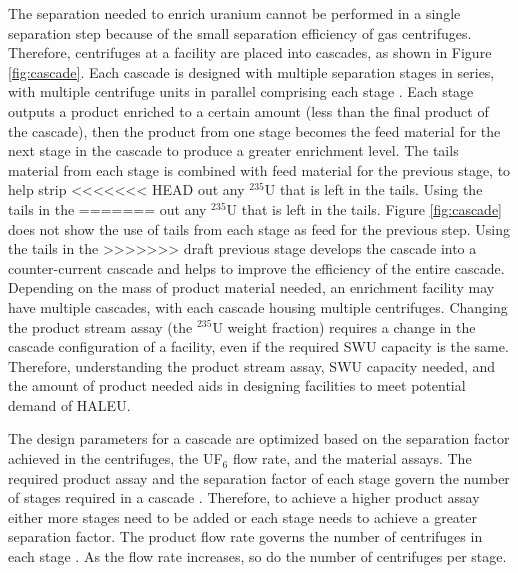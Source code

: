 The separation needed to enrich uranium cannot be performed 
in a single 
separation step because of the small separation efficiency of gas centrifuges. 
Therefore, centrifuges at a facility are placed into  
cascades, as shown in Figure \ref{fig:cascade}. Each cascade is designed with 
multiple separation stages in series, with multiple centrifuge units in 
parallel comprising each stage \cite{villani_uranium_1979}. Each stage 
outputs a product enriched to a certain amount (less than the final product 
of the cascade), then the product from one 
stage becomes the feed material for the next stage in the cascade to produce 
a greater enrichment level. The tails material from each 
stage is combined with feed material for the previous stage, to help strip 
<<<<<<< HEAD
out any $^{235}$U that is left in the tails. Using the tails in the 
=======
out any $^{235}$U that is left in the tails. Figure 
\ref{fig:cascade} does not show the use of tails from each stage 
as feed for the previous step. Using the tails in the 
>>>>>>> draft
previous stage develops the cascade into a counter-current cascade 
\cite{villani_uranium_1979} and helps to improve the efficiency of the entire cascade. 
Depending on the mass of product material needed, an enrichment 
facility may have multiple cascades, with each cascade housing multiple 
centrifuges. 
Changing the product stream assay (the $^{235}$U weight fraction)
requires a change in the cascade configuration of 
a facility, even if the required \gls{SWU} capacity is the same. Therefore, 
understanding the product stream assay, \gls{SWU} capacity needed, and the 
amount of product needed aids in designing facilities to meet potential 
demand of \gls{HALEU}.



The design parameters for a cascade are optimized based on the separation 
factor 
achieved in the centrifuges, the UF$_6$ flow rate, and the material assays. 
The required product assay and the separation factor of each stage govern 
the number of stages required in a cascade \cite{whitaker_uranium_2019}. 
Therefore, to achieve a higher product assay either more stages 
need to be added or each stage needs to achieve a greater separation
factor. The product flow rate governs the number of centrifuges in 
each stage \cite{whitaker_uranium_2019}. As the flow rate increases, 
so do the number of centrifuges per stage. 


%
%
%
